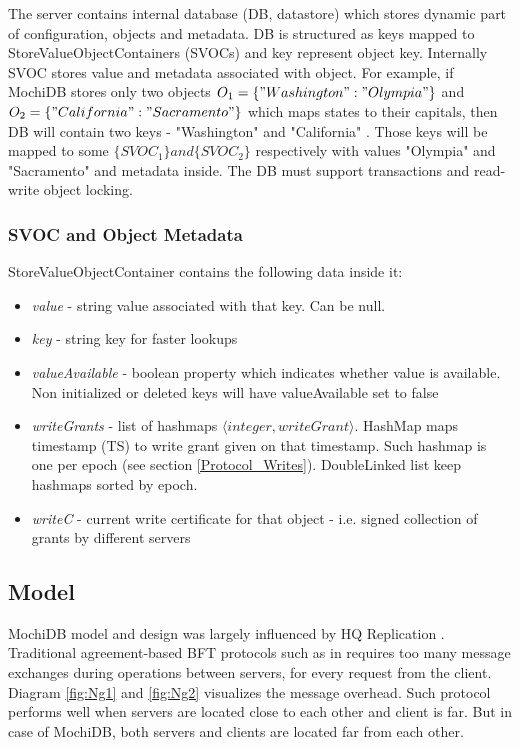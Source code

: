 \documentclass[letterpaper,twocolumn,10pt]{article}
\begin{document}
The server contains internal database (DB, datastore) which stores dynamic part of configuration, objects and metadata. DB is structured as keys mapped to StoreValueObjectContainers (SVOCs) and key represent object key. 
Internally SVOC stores value and metadata associated with object. For example, if MochiDB stores only two objects \(O_{1} = \{ "Washington":"Olympia" \} \) and \(O_{2} = \{ "California" : "Sacramento"\} \) which maps states to their capitals, then DB will contain two keys - {"Washington" and "California" }. Those keys will be mapped to some \( \{ SVOC_{1} \} and \{ SVOC_{2} \} \) respectively with values "Olympia" and "Sacramento" and metadata inside. The DB must support transactions and read-write object locking.

\subsubsection{SVOC and Object Metadata}
StoreValueObjectContainer contains the following data inside it:
\begin{itemize}[noitemsep, topsep=0pt,]
  \item \textit{value} - string value associated with that key. Can be null.
  \item  \textit{key} - string key for faster lookups
  \item  \textit{valueAvailable} - boolean property which indicates whether value is available. Non initialized or deleted keys will have valueAvailable set to false
  \item \textit{writeGrants} - list of hashmaps $\langle integer, writeGrant \rangle$. HashMap maps timestamp (TS) to write grant given on that timestamp. Such hashmap is one per epoch (see section \ref{Protocol_Writes}). DoubleLinked list keep hashmaps sorted by epoch.
  \item \textit{writeC} - current write certificate for that object - i.e. signed collection of grants by different servers
\end{itemize}

\subsection{Model}

MochiDB model and design was largely influenced by HQ Replication \cite{HQ_replication}. Traditional agreement-based BFT protocols such as in \cite{Practical_BFT} requires too many message exchanges during operations between servers, for every request from the client.  Diagram \ref{fig:Ng1} and \ref{fig:Ng2}  visualizes the message overhead. Such protocol performs well when servers are located close to each other and client is far. But in case of MochiDB, both servers and clients are located far from each other.
\end{document}
